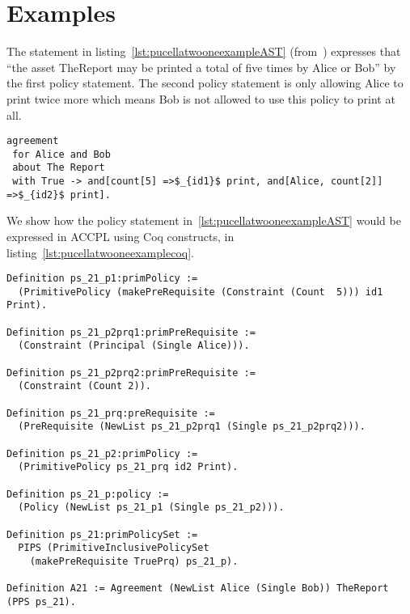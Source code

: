 \section{Examples}

The statement in listing~\ref{lst:pucellatwooneexampleAST} (from~\cite{pucella2006}) expresses that ``the asset TheReport may be printed a total of five times by Alice or Bob'' by the first policy statement. The second policy statement is only allowing Alice to print twice more which means Bob is not allowed to use this policy to print at all. 

\lstset{language=Pucella2006}
\begin{minipage}[c]{0.95\textwidth}
\begin{lstlisting}[frame=single, caption={Agreement of Example 2.1}, label={lst:pucellatwooneexampleAST}, mathescape]
agreement
 for Alice and Bob 
 about The Report 
 with True -> and[count[5] =>$_{id1}$ print, and[Alice, count[2]] =>$_{id2}$ print].
\end{lstlisting}
\end{minipage} 

We show how the policy statement in~\ref{lst:pucellatwooneexampleAST} would be expressed in \ac{ACCPL} using Coq constructs, in listing~\ref{lst:pucellatwooneexamplecoq}.

\begin{minipage}[c]{0.95\textwidth}
\begin{lstlisting}
Definition ps_21_p1:primPolicy := 
  (PrimitivePolicy (makePreRequisite (Constraint (Count  5))) id1 Print).

Definition ps_21_p2prq1:primPreRequisite := 
  (Constraint (Principal (Single Alice))).

Definition ps_21_p2prq2:primPreRequisite := 
  (Constraint (Count 2)).

Definition ps_21_prq:preRequisite := 
  (PreRequisite (NewList ps_21_p2prq1 (Single ps_21_p2prq2))).

Definition ps_21_p2:primPolicy := 
  (PrimitivePolicy ps_21_prq id2 Print).

Definition ps_21_p:policy := 
  (Policy (NewList ps_21_p1 (Single ps_21_p2))).

Definition ps_21:primPolicySet :=
  PIPS (PrimitiveInclusivePolicySet
    (makePreRequisite TruePrq) ps_21_p).

Definition A21 := Agreement (NewList Alice (Single Bob)) TheReport (PPS ps_21).
\end{lstlisting}
\end{minipage} 

